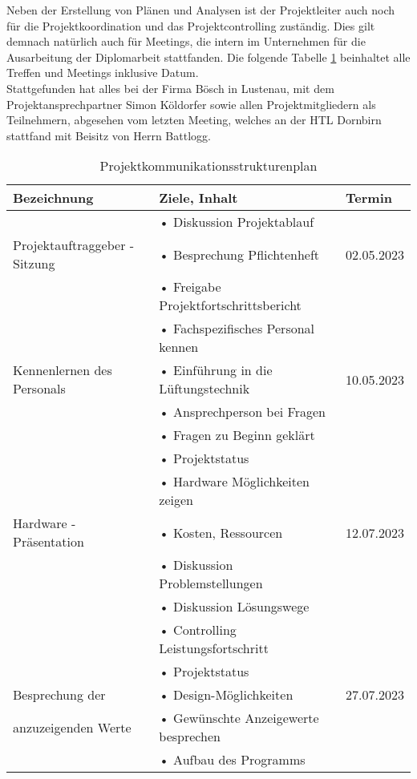 Neben der Erstellung von Plänen und Analysen ist der Projektleiter auch noch für die Projektkoordination und das Projektcontrolling zuständig. Dies gilt demnach natürlich auch für Meetings, die intern im Unternehmen für die Ausarbeitung der Diplomarbeit stattfanden. Die folgende Tabelle \ref{tab:strukturenplan} beinhaltet alle Treffen und Meetings inklusive Datum. \\
Stattgefunden hat alles bei der Firma Bösch in Lustenau, mit dem Projektansprechpartner Simon Köldorfer sowie allen Projektmitgliedern als Teilnehmern, abgesehen vom letzten Meeting, welches an der HTL Dornbirn stattfand mit Beisitz von Herrn Battlogg.

\begin{table}[H]
	\caption{Projektkommunikationsstrukturenplan}
	\label{tab:strukturenplan}
	\centering
	\begin{tabular}{p{} | p{} | p{}}
		\toprule
		\textbf{Bezeichnung} & \textbf{Ziele, Inhalt} & \textbf{Termin} \\
		\midrule
			& • Diskussion Projektablauf & \\
		Projektauftraggeber - Sitzung &  • Besprechung Pflichtenheft  & 02.05.2023 \\
 			& • Freigabe Projektfortschrittsbericht & \\
 		\midrule
 			& • Fachspezifisches Personal kennen & \\
 		Kennenlernen des Personals	& • Einführung in die Lüftungstechnik & 10.05.2023 \\
 			& • Ansprechperson bei Fragen & \\
 			& • Fragen zu Beginn geklärt & \\
 		\midrule
 			& •	Projektstatus & \\
 			& •	Hardware Möglichkeiten zeigen & \\
 		Hardware - Präsentation	& • Kosten, Ressourcen & 12.07.2023 \\ 
 			& • Diskussion Problemstellungen & \\
 			& • Diskussion Lösungswege & \\
 			& •	Controlling Leistungsfortschritt & \\
 		\midrule
 			& •	Projektstatus & \\
 		Besprechung der & •	Design-Möglichkeiten & 27.07.2023 \\
 		anzuzeigenden Werte& •	Gewünschte Anzeigewerte besprechen & \\
 			& • Aufbau des Programms  & \\

\end{tabular}
\end{table}
